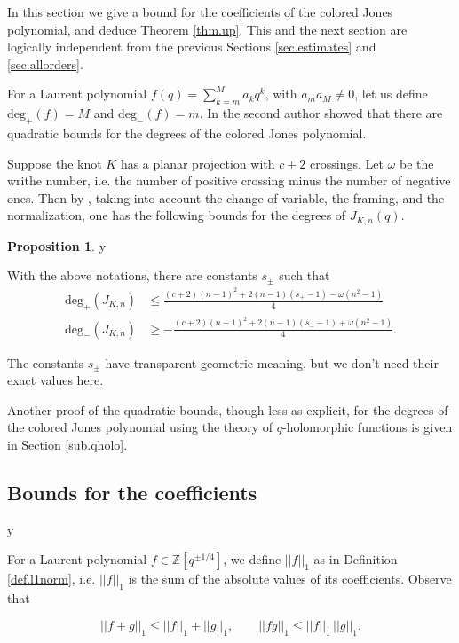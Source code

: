 \documentclass{amsart}
\theoremstyle{definition}
\newtheorem{proposition}[theorem]{Proposition}
\def\printname#1{
    \if\draft y
        \smash{\makebox[0pt]{\hspace{-0.5in}
            \raisebox{8pt}{\tt\tiny #1}}}
    \fi
}
\def\lbl#1{\label{#1}\printname{#1}}
\def\BZ{\mathbb Z}
\def\w{\omega}
\def\w{\omega}
\def\maxdeg{\mathrm{deg}_+}
\def\mindeg{\mathrm{deg}_-}
\begin{document}
In this section we give a bound for the coefficients of the colored
Jones polynomial, and deduce Theorem \ref{thm.up}. This and the
next section are logically independent from the previous Sections
\ref{sec.estimates} and \ref{sec.allorders}.

For a Laurent polynomial $f(q)=\sum_{k=m}^M a_k q^k$, with $a_m a_M
\neq 0$, let us define $\maxdeg(f)=M$ and $\mindeg(f)=m$. In
\cite{Le} the second author showed that there are quadratic bounds for the
 degrees  of the colored Jones polynomial.

Suppose the knot $K$ has a planar projection
with $c+2$ crossings. Let $\w$ be the writhe number, i.e. the number
of positive crossing minus the number of negative ones.
Then by  \cite[Proposition 2.1]{Le}, taking
into account the change of variable, the framing, and the
normalization, one has the following bounds for the degrees of
$J_{K,n}(q)$.

\begin{proposition}
\lbl{21}
With the above notations, there are constants $s_\pm$ such that
$$
\begin{aligned} \maxdeg(J_{K,n})  & \le \frac{(c+2)(n-1)^2 +
2(n-1)(s_+-1) -\w(n^2-1)}{4}  \\
 \mindeg(J_{K,n}) &\ge -\frac{(c+2)(n-1)^2 + 2(n-1)(s_--1) +\w(n^2-1)}{4}.
\end{aligned}
$$
\end{proposition}
The constants $s_\pm$ have transparent geometric meaning, but we don't need
their exact values here.

Another proof of the quadratic bounds, though less as explicit,  for the
degrees of the colored Jones polynomial using the theory of $q$-holomorphic
functions is given in Section \ref{sub.qholo}.

\subsection{Bounds for the coefficients}
\lbl{sub.coeffbounds}

For a Laurent polynomial $f\in \BZ[q^{\pm 1/4}]$, we define $||f||_1$ as in
Definition \ref{def.l1norm}, i.e. $||f||_1$ is the sum of the absolute
values of its coefficients. Observe that

\begin{equation}
 ||f+g||_1 \leq ||f||_1+||g||_1, \qquad ||fg||_1 \leq
||f||_1 \, ||g||_1. \label{eq.ineq}
\end{equation}
\end{document}
